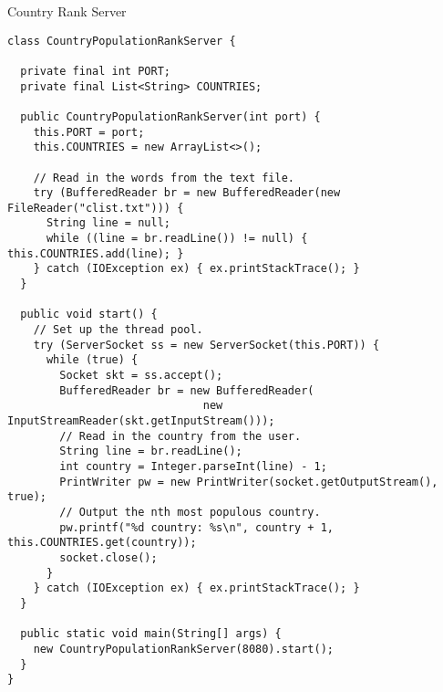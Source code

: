 \begin{cl}{Country Rank Server}
\begin{lstlisting}[language=MyJava]
class CountryPopulationRankServer {

  private final int PORT;
  private final List<String> COUNTRIES;

  public CountryPopulationRankServer(int port) {
    this.PORT = port;
    this.COUNTRIES = new ArrayList<>();

    // Read in the words from the text file.
    try (BufferedReader br = new BufferedReader(new FileReader("clist.txt"))) {
      String line = null;
      while ((line = br.readLine()) != null) { this.COUNTRIES.add(line); }
    } catch (IOException ex) { ex.printStackTrace(); }
  }

  public void start() {
    // Set up the thread pool.
    try (ServerSocket ss = new ServerSocket(this.PORT)) {
      while (true) {
        Socket skt = ss.accept();
        BufferedReader br = new BufferedReader(
                              new InputStreamReader(skt.getInputStream()));
        // Read in the country from the user.
        String line = br.readLine();
        int country = Integer.parseInt(line) - 1;
        PrintWriter pw = new PrintWriter(socket.getOutputStream(), true);
        // Output the nth most populous country.
        pw.printf("%d country: %s\n", country + 1, this.COUNTRIES.get(country));
        socket.close();
      }
    } catch (IOException ex) { ex.printStackTrace(); }
  }

  public static void main(String[] args) {
    new CountryPopulationRankServer(8080).start();
  }
}
\end{lstlisting}
\end{cl}

